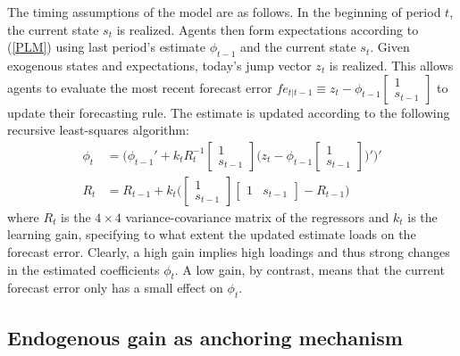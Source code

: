 \documentclass[11pt]{article}
\renewcommand{\[}{\begin{equation}}
\renewcommand{\]}{\end{equation}}
\begin{document}
The timing assumptions of the model are as follows. In the beginning of period $t$, the current state $s_t$ is realized. Agents then form expectations according to (\ref{PLM}) using last period's estimate $\phi_{t-1}$ and the current state $s_t$. Given exogenous states and expectations, today's jump vector $z_t$ is realized. This allows agents to evaluate the most recent forecast error $fe_{t|t-1} \equiv z_t - \phi_{t-1}\begin{bmatrix} 1\\ s_{t-1}\end{bmatrix}$ to update their forecasting rule. The estimate is updated according to the following recursive least-squares algorithm:
\begin{align}
\phi_t  & = \bigg( \phi_{t-1}' + k_t R_t^{-1}\begin{bmatrix} 1 \\ s_{t-1} \end{bmatrix}\bigg(z_{t} - \phi_{t-1} \begin{bmatrix} 1 \\ s_{t-1} \end{bmatrix} \bigg)' \bigg)' \label{RLS} \\
R_t &= R_{t-1} +  k_t \bigg( \begin{bmatrix} 1 \\ s_{t-1} \end{bmatrix} \begin{bmatrix} 1 & s_{t-1} \end{bmatrix}  - R_{t-1} \bigg)
\end{align}
where $R_t$ is the $4\times 4$ variance-covariance matrix of the regressors and $k_t$ is the learning gain, specifying to what extent the updated estimate loads on the forecast error. Clearly, a high gain implies high loadings and thus strong changes in the estimated coefficients $\phi_t$. A low gain, by contrast, means that the current forecast error only has a small effect on $\phi_t$.

\subsection{Endogenous gain as anchoring mechanism}
\end{document}
